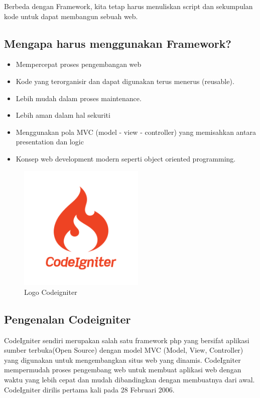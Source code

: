 Berbeda dengan Framework, kita tetap harus menuliskan script dan sekumpulan kode untuk dapat membangun sebuah web. 

\subsection{Mengapa harus menggunakan Framework?}
\begin{itemize}
	\item Mempercepat proses pengembangan web
	\item Kode yang terorganisir dan dapat digunakan terus menerus (reusable).
	\item Lebih mudah dalam proses maintenance.
	\item Lebih aman dalam hal sekuriti
	\item Menggunakan pola MVC (model - view - controller) yang memisahkan antara presentation dan logic
	\item Konsep web development modern seperti object oriented programming.

\end{itemize}

	\begin{figure}[H]
		\includegraphics[width=6cm]{figures/web/logocodeigniter.png}
		\centering
		\caption{Logo Codeigniter}
	\end{figure}

\subsection{Pengenalan Codeigniter}

CodeIgniter sendiri merupakan salah satu framework php yang bersifat aplikasi sumber terbuka(Open Source) dengan model MVC (Model, View, Controller) yang digunakan untuk mengembangkan situs web yang dinamis. CodeIgniter mempermudah proses pengembang web untuk membuat aplikasi web dengan waktu yang lebih cepat dan mudah dibandingkan dengan membuatnya dari awal. CodeIgniter dirilis pertama kali pada 28 Februari 2006. 

